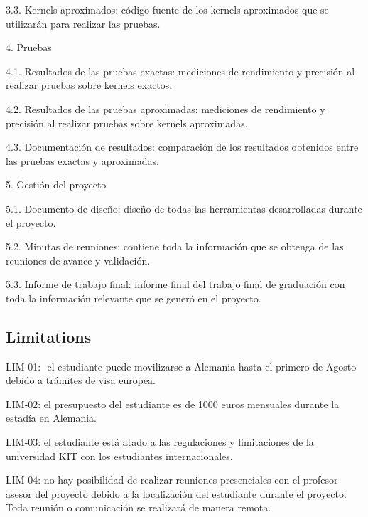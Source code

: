 3.3. Kernels aproximados: código fuente de los kernels aproximados que se utilizarán para
realizar las pruebas.

4. Pruebas

4.1. Resultados de las pruebas exactas: mediciones de rendimiento y precisión al realizar
pruebas sobre kernels exactos.

4.2. Resultados de las pruebas aproximadas: mediciones de rendimiento y precisión al
realizar pruebas sobre kernels aproximadas.

4.3. Documentación de resultados: comparación de los resultados obtenidos entre las
pruebas exactas y aproximadas.

5. Gestión del proyecto

5.1. Documento de diseño: diseño de todas las herramientas desarrolladas durante el
proyecto.

5.2. Minutas de reuniones: contiene toda la información que se obtenga de las reuniones de
avance y validación.

5.3. Informe de trabajo final: informe final del trabajo final de graduación con toda la
información relevante que se generó en el proyecto.

\subsection{Limitations}

LIM-01: ​ el estudiante puede movilizarse a Alemania hasta el primero de Agosto debido a trámites de
visa europea.

LIM-02:​ el presupuesto del estudiante es de 1000 euros mensuales durante la estadía en Alemania.

LIM-03: el estudiante está atado a las regulaciones y limitaciones de la universidad KIT con los
estudiantes internacionales.

LIM-04: no hay posibilidad de realizar reuniones presenciales con el profesor asesor del proyecto debido a
la localización del estudiante durante el proyecto. Toda reunión o comunicación se realizará de manera
remota.



